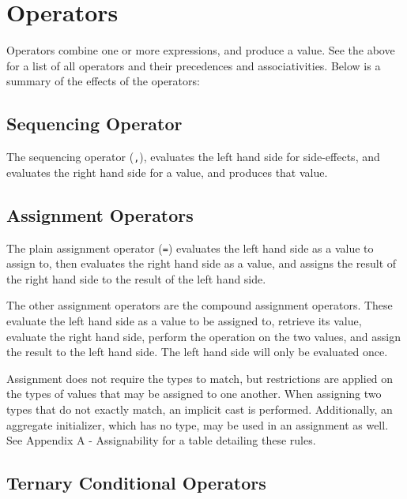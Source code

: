 \documentclass[letterpaper,12pt]{book}
\begin{document}
\section{Operators}

Operators combine one or more expressions, and produce a value. See the above for a list of all operators and their precedences and associativities. Below is a summary of the effects of the operators:

\subsection{Sequencing Operator}



The sequencing operator (\texttt{,}), evaluates the left hand side for side-effects, and evaluates the right hand side for a value, and produces that value.

\subsection{Assignment Operators}



The plain assignment operator (\texttt{=}) evaluates the left hand side as a value to assign to, then evaluates the right hand side as a value, and assigns the result of the right hand side to the result of the left hand side.

The other assignment operators are the compound assignment operators. These evaluate the left hand side as a value to be assigned to, retrieve its value, evaluate the right hand side, perform the operation on the two values, and assign the result to the left hand side. The left hand side will only be evaluated once.

Assignment does not require the types to match, but restrictions are applied on the types of values that may be assigned to one another. When assigning two types that do not exactly match, an implicit cast is performed. Additionally, an aggregate initializer, which has no type, may be used in an assignment as well. See Appendix A - Assignability for a table detailing these rules.

\subsection{Ternary Conditional Operators}
\end{document}
